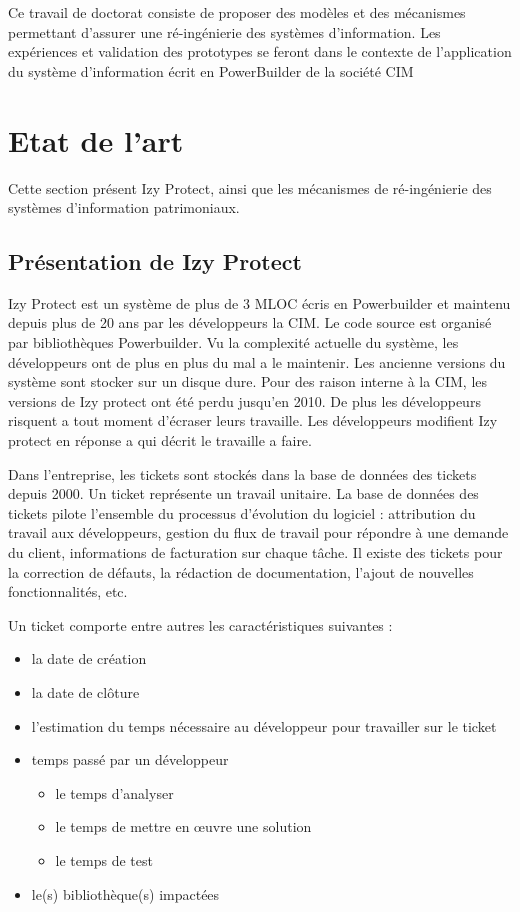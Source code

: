 \documentclass[a4paper]{article}
\begin{document}
Ce travail de doctorat consiste de proposer des modèles et des mécanismes permettant d'assurer
une ré-ingénierie des systèmes d'information. Les expériences et validation des prototypes se feront dans le contexte de l'application du système d'information écrit en PowerBuilder de la société CIM
\section{Etat de l'art}
\label{sec:stateOfTheArt}

Cette section présent Izy Protect, ainsi que les mécanismes de ré-ingénierie des systèmes d'information patrimoniaux.
\subsection{Présentation de Izy Protect}
\label{sec:izyProtect}
Izy Protect est un système de plus de 3 MLOC écris en Powerbuilder et maintenu depuis plus de 20 ans par les développeurs la CIM. Le code source est organisé par bibliothèques Powerbuilder.
Vu la complexité actuelle du système, les développeurs ont de plus en plus du mal a le maintenir. Les ancienne versions du système sont stocker sur un disque dure. Pour des raison interne à la CIM, les versions de Izy protect ont été perdu jusqu'en 2010.  De plus les développeurs risquent a tout moment d'écraser leurs travaille. Les développeurs modifient Izy protect en réponse a qui décrit le travaille a faire. 

Dans l'entreprise, les tickets sont stockés dans la base de données des tickets depuis 2000.
Un ticket représente un travail unitaire.
La base de données des tickets pilote l'ensemble du processus d'évolution du logiciel : attribution du travail aux développeurs, gestion du flux de travail pour répondre à une demande du client, informations de facturation sur chaque tâche.
Il existe des tickets pour la correction de défauts, la rédaction de documentation, l'ajout de nouvelles fonctionnalités, etc. 

Un ticket comporte entre autres les caractéristiques suivantes :

\begin{itemize}
\item  la date de création
\item la date de clôture
\item l'estimation du temps nécessaire au développeur pour travailler sur le ticket
\item temps passé par un développeur
  \begin{itemize}
  \item le temps d'analyser
  \item le temps de mettre en œuvre une solution
  \item le temps de test
  \end{itemize}
  \item le(s) bibliothèque(s) impactées
\end{itemize}
\end{document}
